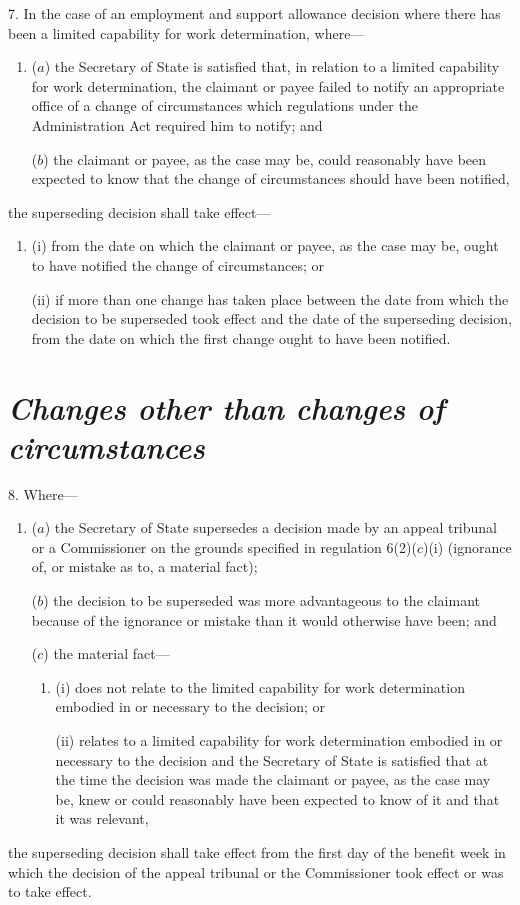 \documentclass[12pt,a4paper]{article}
\begin{document}
\medskip

7.  In the case of an employment and support allowance decision where there has been a limited capability for work determination, where—
\begin{enumerate}\item[]
($a$) the Secretary of State is satisfied that, in relation to a limited capability for work determination, the claimant or payee failed to notify an appropriate office of a change of circumstances which regulations under the Administration Act required him to notify; and

($b$) the claimant or payee, as the case may be, could reasonably have been expected to know that the change of circumstances should have been notified,
\end{enumerate}
the superseding decision shall take effect—
\begin{enumerate}\item[]
(i) from the date on which the claimant or payee, as the case may be, ought to have notified the change of circumstances; or

(ii) if more than one change has taken place between the date from which the decision to be superseded took effect and the date of the superseding decision, from the date on which the first change ought to have been notified.
\end{enumerate}

\section*{\itshape Changes other than changes of circumstances}

8.  Where—
\begin{enumerate}\item[]
($a$) the Secretary of State supersedes a decision made by an appeal tribunal or a Commissioner on the grounds specified in regulation 6(2)($c$)(i)  (ignorance of, or mistake as to, a material fact);

($b$) the decision to be superseded was more advantageous to the claimant because of the ignorance or mistake than it would otherwise have been; and

($c$) the material fact—
\begin{enumerate}\item[]
(i) does not relate to the limited capability for work determination embodied in or necessary to the decision; or

(ii) relates to a limited capability for work determination embodied in or necessary to the decision and the Secretary of State is satisfied that at the time the decision was made the claimant or payee, as the case may be, knew or could reasonably have been expected to know of it and that it was relevant,
\end{enumerate}
\end{enumerate}
the superseding decision shall take effect from the first day of the benefit week in which the decision of the appeal tribunal or the Commissioner took effect or was to take effect.
\end{document}
